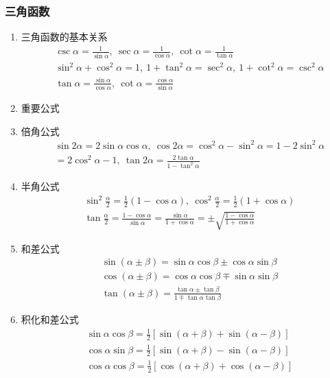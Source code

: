 \subsubsection{三角函数}
\begin{enumerate}
\item 三角函数的基本关系
\[ \begin{split}&\csc \alpha=\frac{1}{\sin \alpha},\ \sec \alpha=\frac{1}{\cos \alpha},\ \cot \alpha=\frac{1}{\tan \alpha}\\& \sin^{2}\alpha +\cos^{2}\alpha =1,\ 1+\tan^{2}\alpha = \sec^{2}\alpha,\ 1+\cot^{2}\alpha =\csc^{2}\alpha\\ &\tan \alpha=\frac{\sin \alpha}{\cos \alpha},\ \cot \alpha=\frac{\cos \alpha}{\sin \alpha}\end{split}\]
\item 重要公式
\item 倍角公式
\[ \begin{split}
& \sin 2\alpha=2\sin \alpha \cos \alpha,\ \cos 2\alpha =\cos^{2}\alpha -\sin^{2}\alpha =1-2\sin^{2}\alpha\\&=2\cos^{2}\alpha -1,\ \tan 2\alpha =\frac{2\tan \alpha}{1-\tan^{2}\alpha}
\end{split} \]
\item 半角公式
\[ \begin{split}
& \sin^{2}\frac{\alpha}{2}=\frac{1}{2}(1-\cos \alpha),\ \cos^{2}\frac{\alpha}{2}=\frac{1}{2}(1+\cos \alpha) \\
& \tan \frac{\alpha}{2}=\frac{1-\cos \alpha}{\sin \alpha}=\frac{\sin \alpha}{1+\cos \alpha}=\pm \sqrt{\frac{1-\cos \alpha}{1+\cos \alpha}}
\end{split} \]
\item 和差公式
\[ \begin{split}
& \sin(\alpha \pm \beta)=\sin\alpha\cos\beta \pm \cos\alpha\sin\beta \\
& \cos(\alpha \pm \beta)=\cos\alpha\cos\beta \mp \sin\alpha\sin\beta \\
& \tan(\alpha \pm \beta)=\frac{\tan\alpha \pm \tan\beta}{1 \mp \tan\alpha\tan\beta}
\end{split} \]
\item 积化和差公式
\[ \begin{split}
& \sin\alpha\cos\beta = \frac{1}{2}[\sin(\alpha + \beta) + \sin(\alpha - \beta)] \\
& \cos\alpha\sin\beta = \frac{1}{2}[\sin(\alpha + \beta) - \sin(\alpha - \beta)] \\
& \cos\alpha\cos\beta = \frac{1}{2}[\cos(\alpha + \beta) + \cos(\alpha - \beta)] \\

\end{split}\]
\end{enumerate}
